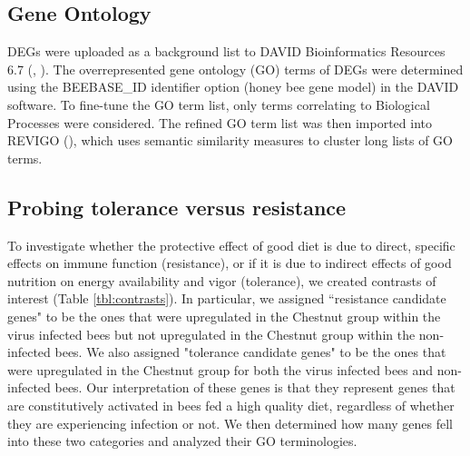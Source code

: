 \documentclass[11pt,a4paper,oldfontcommands,openany]{memoir}
\numberwithin{equation}{section} %
\begin{document}
\subsection{Gene Ontology}

DEGs were uploaded as a background list to DAVID Bioinformatics Resources 6.7 (\citealt{davidBio}, \citealt{davidBio2}). The overrepresented gene ontology (GO) terms of DEGs were determined using the BEEBASE\_ID identifier option (honey bee gene model) in the DAVID software. To fine-tune the GO term list, only terms correlating to Biological Processes were considered. The refined GO term list was then imported into REVIGO (\citealt{revigo}), which uses semantic similarity measures to cluster long lists of GO terms.

\subsection{Probing tolerance versus resistance}

To investigate whether the protective effect of good diet is due to direct, specific effects on immune function (resistance), or if it is due to indirect effects of good nutrition on energy availability and vigor (tolerance), we created contrasts of interest (Table \ref{tbl:contrasts}). In particular, we assigned ``resistance candidate genes" to be the ones that were upregulated in the Chestnut group within the virus infected bees but not upregulated in the Chestnut group within the non-infected bees. We also assigned "tolerance candidate genes" to be the ones that were upregulated in the Chestnut group for both the virus infected bees and non-infected bees. Our interpretation of these genes is that they represent genes that are constitutively activated in bees fed a high quality diet, regardless of whether they are experiencing infection or not. We then determined how many genes fell into these two categories and analyzed their GO terminologies.
\end{document}
